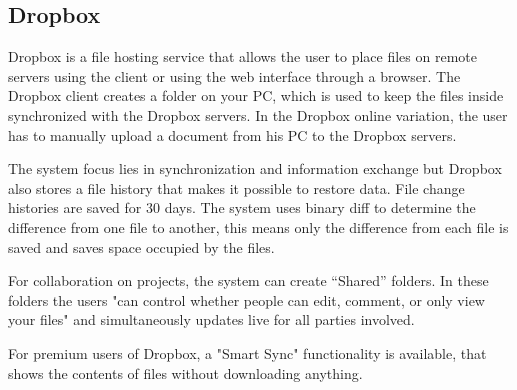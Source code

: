 \subsection{Dropbox}
Dropbox is a file hosting service that allows the user to place files on remote servers using the client or using the web interface through a browser.
The Dropbox client creates a folder on your PC, which is used to keep the files inside synchronized with the Dropbox servers. In the Dropbox online variation, the user has to manually upload a document from his PC to the Dropbox servers. 

The system focus lies in synchronization and information exchange but Dropbox also stores a file history that makes it possible to restore data.
File change histories are saved for 30 days. 
The system uses binary diff to determine the difference from one file to another, this means only the difference from each file is saved and saves space occupied by the files.\cite{DropboxDiff}

For collaboration on projects, the system can create “Shared” folders. In these folders the users "can control whether people can edit, comment, or only view your files" and simultaneously updates live for all parties involved.\cite{DropboxShared}

For premium users of Dropbox, a "Smart Sync" functionality is available, that shows the contents of files without downloading anything.\cite{DropboxSmartSync}
 
 
